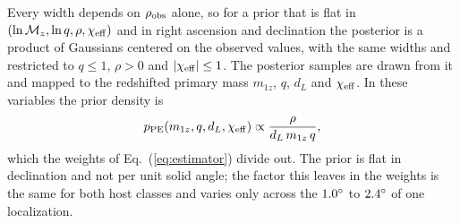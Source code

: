 \documentclass[aps,prd,reprint,twocolumn,superscriptaddress,nofootinbib,floatfix,nolongbibliography]{revtex4-2}
\newcommand{\chieff}{\chi_{\rm eff}}
\begin{document}
Every width depends on $\rho_{\rm obs}$ alone, so for a prior that is flat
in $(\ln\mathcal{M}_z,\ln q,\rho,\chieff)$ and in right ascension and
declination the posterior is a product of Gaussians centered on the observed
values, with the same widths and restricted to $q\leq1$, $\rho>0$ and
$|\chieff|\leq1$. The posterior samples are drawn from it and mapped to the
redshifted primary mass $m_{1z}$, $q$, $d_L$ and $\chieff$. In these
variables the prior density is
\begin{equation}
p_{\rm PE}(m_{1z},q,d_L,\chieff)\propto\frac{\rho}{d_L\,m_{1z}\,q} ,
\label{eq:ppe}
\end{equation}
which the weights of Eq.~(\ref{eq:estimator}) divide out. The prior is flat
in declination and not per unit solid angle; the factor this leaves in the
weights is the same for both host classes and varies only across the
$1.0^\circ$ to $2.4^\circ$ of one localization.


\end{document}
